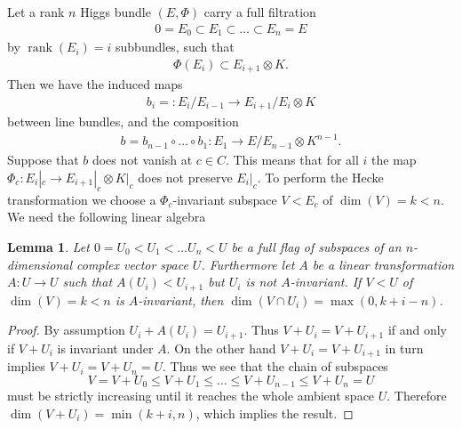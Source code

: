 \documentclass[12pt]{article}
\numberwithin{equation}{section}
\newtheorem{lemma}[theorem]{Lemma}
\theoremstyle{remark}
\theoremstyle{definition}
\numberwithin{theorem}{section}
\def\beq{\begin{eqnarray}}
\def\eeq{\end{eqnarray}}
\DeclareMathOperator{\rank}{rank}
\renewcommand{\1}{\mathbbm{1}}
\begin{document}
Let a rank $n$ Higgs bundle $(E,\Phi)$ carry a full filtration \beq\label{fullfiltration}0=E_0\subset E_1\subset\dots\subset E_n=E\eeq by $\rank(E_i)=i$ subbundles, such that \beq\label{compatible}\Phi(E_i)\subset E_{i+1}\otimes K.\eeq Then we have the induced maps \beq\label{bi}b_i=:E_i/E_{i-1}\to E_{i+1}/E_i\otimes K\eeq between line bundles, and the composition \beq \label{be}b=b_{n-1}\circ \dots \circ b_1:E_1\to E/{E_{n-1}}\otimes K^{n-1}.\eeq Suppose that $b$ does not vanish at $c\in C$. This means that for all $i$ the map  $\Phi_c: E_{i}|_c\to E_{i+1}|_c\otimes K|_c$ does not preserve $E_i|_c$.  To perform the Hecke transformation we choose a $\Phi_c$-invariant subspace $V<E_c$ of $\dim(V)=k< n$.  We need the following linear algebra
\begin{lemma}\label{linear} Let $0=U_0<U_1<\dots U_n<U$ be a full flag of subspaces of an $n$-dimensional complex vector space $U$. Furthermore let $A$ be a linear transformation $A:U\to U$ such that $A(U_i)<U_{i+1}$ but $U_i$ is not $A$-invariant. If $V< U$ of $\dim(V)=k< n$ is $A$-invariant, then 
	$\dim (V\cap U_i)= \max(0,k+i-n)$.
\end{lemma}
\begin{proof} By assumption $U_i+A(U_i)= U_{i+1}$. Thus $V+U_i=V+U_{i+1}$ if and only if $V+U_i$ is invariant under $A$. On the other hand $V+U_i=V+U_{i+1}$ in turn implies $V+U_i=V+U_n=U$. 
	Thus we see that the chain of subspaces
	$$V=V+U_0\leq V+U_1\leq \dots \leq V+U_{n-1}\leq V+U_n=U$$ must be strictly increasing until it reaches the whole ambient space $U$. Therefore $\dim(V+U_i)=\min(k+i,n)$, which implies the result.  
\end{proof}
\end{document}
